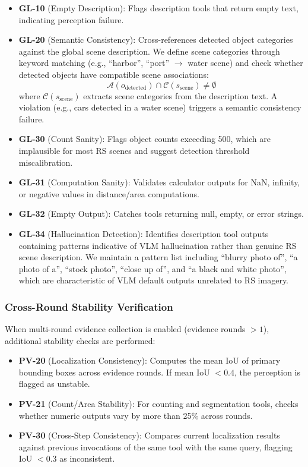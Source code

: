 \documentclass[journal]{IEEEtran}
\begin{document}
\begin{itemize}[leftmargin=*]
    \item \textbf{GL-10} (Empty Description): Flags description tools that return empty text, indicating perception failure.
    \item \textbf{GL-20} (Semantic Consistency): Cross-references detected object categories against the global scene description. We define scene categories through keyword matching (e.g., ``harbor'', ``port'' $\rightarrow$ water scene) and check whether detected objects have compatible scene associations:
    \begin{equation}
        \mathcal{A}(o_{\text{detected}}) \cap \mathcal{C}(s_{\text{scene}}) \neq \emptyset
    \end{equation}
    where $\mathcal{C}(s_{\text{scene}})$ extracts scene categories from the description text. A violation (e.g., cars detected in a water scene) triggers a semantic consistency failure.
    \item \textbf{GL-30} (Count Sanity): Flags object counts exceeding 500, which are implausible for most RS scenes and suggest detection threshold miscalibration.
    \item \textbf{GL-31} (Computation Sanity): Validates calculator outputs for NaN, infinity, or negative values in distance/area computations.
    \item \textbf{GL-32} (Empty Output): Catches tools returning null, empty, or error strings.
    \item \textbf{GL-34} (Hallucination Detection): Identifies description tool outputs containing patterns indicative of VLM hallucination rather than genuine RS scene description. We maintain a pattern list including ``blurry photo of'', ``a photo of a'', ``stock photo'', ``close up of'', and ``a black and white photo'', which are characteristic of VLM default outputs unrelated to RS imagery.
\end{itemize}

\subsubsection{Cross-Round Stability Verification}
When multi-round evidence collection is enabled (evidence rounds $> 1$), additional stability checks are performed:

\begin{itemize}[leftmargin=*]
    \item \textbf{PV-20} (Localization Consistency): Computes the mean IoU of primary bounding boxes across evidence rounds. If mean IoU $< 0.4$, the perception is flagged as unstable.
    \item \textbf{PV-21} (Count/Area Stability): For counting and segmentation tools, checks whether numeric outputs vary by more than 25\% across rounds.
    \item \textbf{PV-30} (Cross-Step Consistency): Compares current localization results against previous invocations of the same tool with the same query, flagging IoU $< 0.3$ as inconsistent.
\end{itemize}
\end{document}
